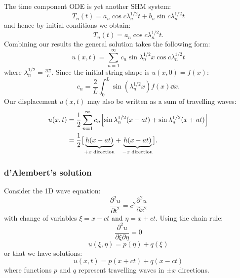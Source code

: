 \documentclass{article}
\begin{document}
\newpage

The time component ODE is yet another SHM system:
$$T_n(t)=a_n\cos c\lambda_n^{1/2}t
+b_n\sin c\lambda_n^{1/2}t$$
and hence by initial conditions we obtain:
$$T_n(t)=a_n\cos c\lambda_n^{1/2}t.$$
Combining our results the general solution takes the following form:
$$u(x,t)=\sum_{n=1}^{\infty}c_n\sin\lambda_n^{1/2}x
\cos c\lambda_n^{1/2}t$$
where $\lambda_n^{1/2}=\displaystyle\frac{n\pi}{L}$.
Since the initial string shape is
$u(x,0)=f(x)$:
$$c_n=\frac{2}{L}\int_{0}^{L}
\sin(\lambda_n^{1/2}x) f(x)\dd x.$$
Our displacement $u(x,t)$ may also be written as
a sum of travelling waves:
\begin{align*}
    u(x,t)
    &=\frac{1}{2}\sum_{n=1}^{\infty}c_n
    \Bigl[\sin\lambda_n^{1/2}(x-at)
    +\sin\lambda_n^{1/2}(x+at)\Bigr] \\
    &=\frac{1}{2}\bigl[\underbrace{h(x-at)}_\text{$+x$ direction}
    +\underbrace{h(x-at)}_\text{$-x$ direction}\bigr].
\end{align*}

\subsubsection{d'Alembert's solution}
Consider the 1D wave equation:
$$\frac{\partial^2u}{\partial t^2}=c^2\frac{\partial^2u}{\partial x^2}$$
with change of variables $\xi=x-ct$ and $\eta=x+ct$.
Using the chain rule:
$$\frac{\partial^2u}{\partial\xi\partial\eta}=0$$
$$u(\xi,\eta)=p(\eta)+q(\xi)$$
or that we have solutions:
$$u(x,t)=p(x+ct)+q(x-ct)$$
where functions $p$ and $q$ represent travelling waves in
$\pm x$ directions.

\newpage
\end{document}
